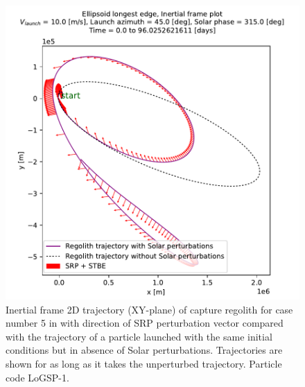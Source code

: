 \begin{figure}[htb]
\centering
\captionsetup{justification=centering}
\includegraphics[width=\textwidth, height=0.5\textheight, keepaspectratio=true]{longest_edge_perturbations/3.2Density_1cmSize/singlePlot_comparative_PerturbationVector_10ms_45Azimuth_315SolarPhase_inertialFrame.pdf}
\caption{Inertial frame 2D trajectory (XY-plane) of capture regolith for case number 5 in  with direction of \gls{SRP} perturbation vector compared with the trajectory of a particle launched with the same initial conditions but in absence of Solar perturbations. Trajectories are shown for as long as it takes the unperturbed trajectory. Particle code LoGSP-1.}
\label{fig:LoGSP_1_capture_case_5_2d_trajectory_comparative_inertialFrame}
\end{figure}
\FloatBarrier

